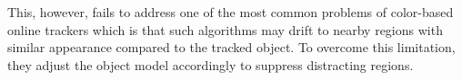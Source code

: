 \documentclass[a4paper,10pt]{article}
\begin{document}
This, however, fails to address one of the most common problems of color-based online trackers which is that such algorithms may drift to nearby regions with similar appearance compared to the tracked object.
To overcome this limitation, they adjust the object model accordingly to suppress distracting regions.
\end{document}
